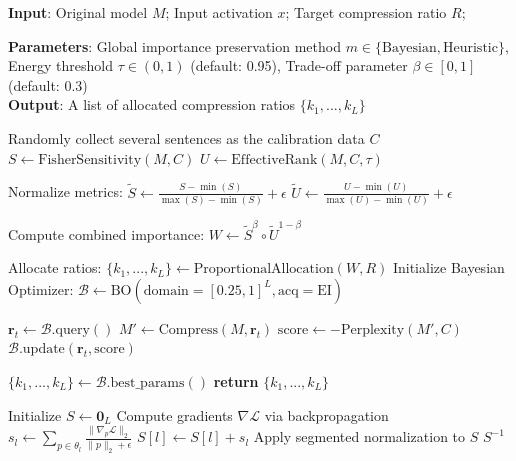 \documentclass[11pt]{article}
\begin{document}
\begin{algorithm*}[ht]
    \caption{Pseudocode of Layer-specific Compression}
    \textbf{Input}: Original model $M$; Input activation $x$; Target compression ratio $R$; \

    \textbf{Parameters}: Global importance preservation method $m \in \{\text{Bayesian}, \text{Heuristic}\}$, Energy threshold $\tau \in (0,1)$ (default: 0.95), Trade-off parameter $\beta \in [0,1]$ (default: 0.3)\\
    \textbf{Output}: A list of allocated compression ratios  $\{k_1,...,k_L\}$  \begin{algorithmic}[1] %
        \State Randomly collect several sentences as the calibration data $C$
            \State $S \gets \text{FisherSensitivity}(M, C)$ 
            \State $U \gets \text{EffectiveRank}(M, C, \tau)$ 
    
            \State Normalize metrics:
     $\tilde{S} \gets \frac{S-\min(S)}{\max(S)-\min(S)} + \epsilon$
    $\tilde{U} \gets \frac{U-\min(U)}{\max(U)-\min(U)} + \epsilon$
    
            \State Compute combined importance:
    $W \gets \tilde{S}^\beta \circ \tilde{U}^{1-\beta}$
    
             \State Allocate ratios:
    $\{k_1,...,k_L\} \gets \text{ProportionalAllocation}(W, R)$
        \Else
        \State Initialize Bayesian Optimizer:
    $\mathcal{B} \gets \text{BO}(\text{domain}=[0.25,1]^L, \text{acq}=\text{EI})$
    
            \State $\mathbf{r}_t \gets \mathcal{B}.\text{query}()$
            \State $M' \gets \text{Compress}(M, \mathbf{r}_t)$ 
            \State $\text{score} \gets -\text{Perplexity}(M', C)$
            \State $\mathcal{B}.\text{update}(\mathbf{r}_t, \text{score})$
        \EndFor
    
        \State $\{k_1,...,k_L\} \gets \mathcal{B}.\text{best\_params}()$
    \EndIf
    \State \textbf{return} $\{k_1,...,k_L\}$
    \end{algorithmic}
\label{algorithm3}
\end{algorithm*}



\begin{algorithm*}[ht]
\caption{Fisher Sensitivity Computation}
\begin{algorithmic}[1]
    \State Initialize $S \gets \mathbf{0}_L$
        \State Compute gradients $\nabla\mathcal{L}$ via backpropagation
            \State $s_l \gets \sum_{p\in\theta_l}\frac{\|\nabla_p\mathcal{L}\|_2}{\|p\|_2 + \epsilon}$
            \State $S[l] \gets S[l] + s_l$
        \EndFor
    \EndFor
    \State Apply segmented normalization to $S$
    \State \Return $S^{-1}$ 
\EndFunction
\end{algorithmic}
\label{algorithm4}
\end{algorithm*}
\end{document}
